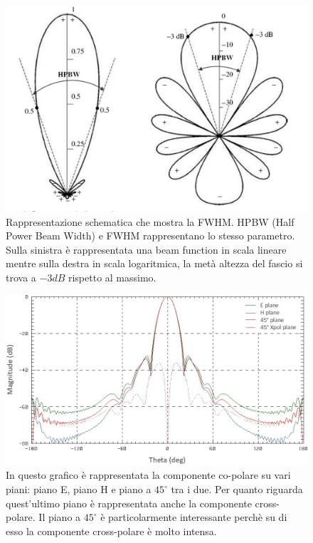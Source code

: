\documentclass[12pt,a4paper,final]{book}
\begin{document}
\begin{figure}[!ht]
	\centering
	\includegraphics[width=0.8\linewidth]{../figures/fwhm.png}
	\caption{Rappresentazione schematica che mostra la FWHM. HPBW (Half Power Beam Width) e FWHM rappresentano lo stesso parametro. Sulla sinistra è rappresentata una beam function in scala lineare mentre sulla destra in scala logaritmica, la metà altezza del fascio si trova a $-3 \unit{dB}$ rispetto al massimo.}
	\label{fwhm}
\end{figure}

\begin{figure}[!ht]
	\centering
	\includegraphics[width=\linewidth]{../figures/plane_cut.png}
	\caption{In questo grafico è rappresentata la componente co-polare su vari piani: piano E, piano H e piano a $45^{\circ}$ tra i due. Per quanto riguarda quest'ultimo piano è rappresentata anche la componente cross-polare. Il piano a $45^{\circ}$ è particolarmente interessante perchè su di esso la componente cross-polare è molto intensa.}
	\label{plane_cut}
\end{figure}

\end{document}

